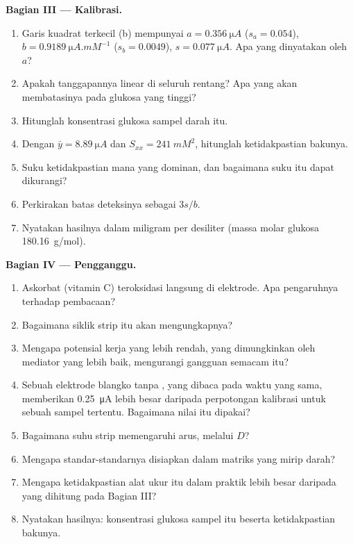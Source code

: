 \begin{problem}
\medskip\noindent\textbf{Bagian III --- Kalibrasi.}
\begin{enumerate}[resume, beginpenalty=10000]
  \item Garis kuadrat terkecil (b) mempunyai $a = \qty{0.356}{\micro A}$
        ($s_a = 0.054$), $b =
        \qty{0.9189}{\micro A.mM^{-1}}$ ($s_b = 0.0049$), $s = \qty{0.077}{\micro A}$.
        Apa yang dinyatakan oleh $a$?
  \item Apakah tanggapannya linear di seluruh rentang? Apa yang akan
        membatasinya pada glukosa yang tinggi?
  \item Hitunglah konsentrasi glukosa sampel darah itu.
  \item Dengan $\bar y = \qty{8.89}{\micro A}$ dan $S_{xx} = \qty{241}{mM^2}$, hitunglah
        ketidakpastian bakunya.
  \item Suku ketidakpastian mana yang dominan, dan bagaimana suku itu dapat
        dikurangi?
  \item Perkirakan batas deteksinya sebagai $3s/b$.
  \item Nyatakan hasilnya dalam miligram per desiliter (massa molar glukosa
        \qty{180.16}{g/mol}).
\end{enumerate}

\medskip\noindent\textbf{Bagian IV --- Pengganggu.}
\begin{enumerate}[resume, beginpenalty=10000]
  \item Askorbat (vitamin C) teroksidasi langsung di elektrode. Apa
        pengaruhnya terhadap pembacaan?
  \item Bagaimana  siklik strip itu akan mengungkapnya?
  \item Mengapa potensial kerja yang lebih rendah, yang dimungkinkan oleh
        mediator yang lebih baik, mengurangi gangguan semacam itu?
  \item Sebuah elektrode blangko tanpa , yang dibaca pada waktu yang sama,
        memberikan \qty{0.25}{\micro A} lebih besar daripada perpotongan
        kalibrasi untuk sebuah sampel tertentu. Bagaimana nilai itu dipakai?
  \item Bagaimana suhu strip memengaruhi arus, melalui $D$?
  \item Mengapa standar-standarnya disiapkan dalam matriks yang mirip darah?
  \item Mengapa ketidakpastian alat ukur itu dalam praktik lebih besar daripada
        yang dihitung pada Bagian III?
  \item Nyatakan hasilnya: konsentrasi glukosa sampel itu beserta
        ketidakpastian bakunya.
\end{enumerate}
\end{problem}
